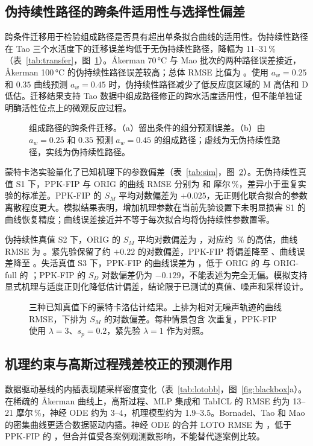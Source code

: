 \subsection{伪持续性路径的跨条件适用性与选择性偏差}
跨条件迁移用于检验组成路径是否具有超出单条拟合曲线的适用性。伪持续性路径在 Tao 三个水活度下的迁移误差均低于无伪持续性路径，降幅为 11--31\,\%（表~\ref{tab:transfer}，图~\ref{fig:transfer}）。Åkerman 70\,°C 与 Mao 批次的两种路径误差接近，Åkerman 100\,°C 的伪持续性路径误差较高；总体 RMSE 比值为 \TransferRatio。使用 $a_w=0.25$ 和 $0.35$ 曲线预测 $a_w=0.45$ 时，伪持续性路径减少了低反应度区域的 M 高估和 D 低估。迁移结果支持 Tao 数据中组成路径修正的跨水活度适用性，但不能单独证明酶活性位点上的微观反应过程。
\begin{figure}[!htbp]\centering{}\caption{组成路径的跨条件迁移。（a）留出条件的组分预测误差。（b）由 $a_w=0.25$ 和 $0.35$ 预测 $a_w=0.45$ 的组成路径；虚线为无伪持续性路径，实线为伪持续性路径。}\label{fig:transfer}\end{figure}

蒙特卡洛实验量化了已知机理下的参数偏差（表~\ref{tab:sim}，图~\ref{fig:sim}）。无伪持续性真值 S1 下，PPK-FIP 与 ORIG 的曲线 RMSE 分别为 \SimSiNew{} 和 \SimSiOrig{} 摩尔\,\%，差异小于重复实验的标准差。PPK-FIP 的 $S_M$ 平均对数偏差为 $+0.025$，无正则化联合拟合的参数离散程度更大。模拟结果表明，增加机理参数在当前先验设置下未明显损害 S1 的曲线恢复精度；曲线误差接近并不等于每次拟合均将伪持续性参数置零。

伪持续性真值 S2 下，ORIG 的 $S_M$ 平均对数偏差为 \SimSMBiasOrig，对应约 \SimSMBiasOrigPct\,\% 的高估，曲线 RMSE 为 \SimSiiOrig。紧先验保留了约 $+0.22$ 的对数偏差，PPK-FIP 将偏差降至 \SimSMBiasNew、曲线误差降至 \SimSiiNew。失活真值 S3 下，PPK-FIP 的曲线误差为 \SimSiiiNew，低于 ORIG 的 \SimSiiiOrig{} 与 ORIG-full 的 \SimSiiiFull；PPK-FIP 的 $S_D$ 对数偏差仍为 $-0.129$，不能表述为完全无偏。模拟支持显式机理与适度正则化降低估计偏差，结论限于已测试的真值、噪声和采样设计。
\begin{figure}[!htbp]\centering{}\caption{三种已知真值下的蒙特卡洛估计结果。上排为相对无噪声轨迹的曲线 RMSE，下排为 $S_M$ 的对数偏差。每种情景包含 \NSimReps{} 次重复，PPK-FIP 使用 $\lambda=3$、$s_p=0.2$，紧先验 $\lambda=1$ 作为对照。}\label{fig:sim}\end{figure}

\subsection{机理约束与高斯过程残差校正的预测作用}
数据驱动基线的内插表现随采样密度变化（表~\ref{tab:lotobb}，图~\ref{fig:blackbox}a）。在稀疏的 Åkerman 曲线上，高斯过程、MLP 集成和 TabICL 的 RMSE 约为 13--21 摩尔\,\%，神经 ODE 约为 3--4，机理模型约为 1.9--3.5。Bornadel、Tao 和 Mao 的密集曲线更适合数据驱动内插。神经 ODE 的合并 LOTO RMSE 为 \LotoBBNODE，低于 PPK-FIP 的 \LotoAllNew，但合并值受各案例观测数影响，不能替代逐案例比较。


